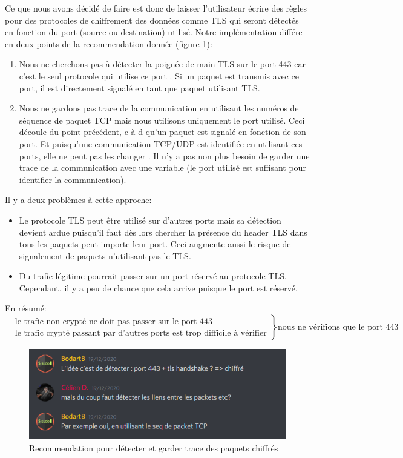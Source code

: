 \documentclass[a4paper]{article}
\begin{document}
Ce que nous avons décidé de faire est donc de laisser l'utilisateur écrire des règles pour des protocoles de chiffrement des données comme TLS qui seront détectés en fonction du port (source ou destination) utilisé. Notre implémentation différe en deux points de la recommendation donnée (figure \ref{fig:tls01}):
\begin{enumerate}
    \item Nous ne cherchons pas à détecter la poignée de main TLS sur le port 443 car c'est le seul protocole qui utilise ce port \cite{5}. Si un paquet est transmis avec ce port, il est directement signalé en tant que paquet utilisant TLS.
    \item Nous ne gardons pas trace de la communication en utilisant les numéros de séquence de paquet TCP mais nous utilisons uniquement le port utilisé. Ceci découle du point précédent, c-à-d qu'un paquet est signalé en fonction de son port. Et puisqu'une communication TCP/UDP est identifiée en utilisant ces ports, elle ne peut pas les changer \cite{4}. Il n'y a pas non plus besoin de garder une trace de la communication avec une variable (le port utilisé est suffisant pour identifier la communication).
\end{enumerate}
Il y a deux problèmes à cette approche:
\begin{itemize}
    \item Le protocole TLS peut être utilisé sur d'autres ports mais sa détection devient ardue puisqu'il faut dès lors chercher la présence du header TLS dans tous les paquets peut importe leur port. Ceci augmente aussi le risque de signalement de paquets n'utilisant pas le TLS.
    \item Du trafic légitime pourrait passer sur un port réservé au protocole TLS. Cependant, il y a peu de chance que cela arrive puisque le port est réservé.
\end{itemize}
En résumé:
\[
    \left.\begin{aligned}
        &\text{le trafic non-crypté ne doit pas passer sur le port 443}\\
        &\text{le trafic crypté passant par d'autres ports est trop difficile à vérifier}
    \end{aligned}\right\} \text{nous ne vérifions que le port 443}
\]

\begin{figure}[H]
    \centering
    \includegraphics[width=0.75\linewidth]{images/tls-01.PNG}
    \caption{Recommendation pour détecter et garder trace des paquets chiffrés}
    \label{fig:tls01}
\end{figure}
\end{document}

